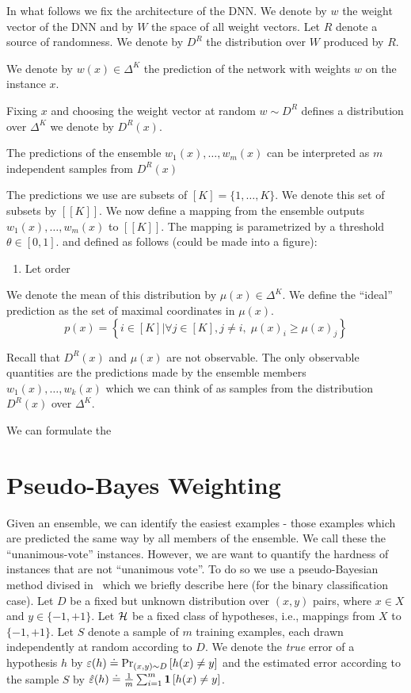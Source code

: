 \documentclass{article}
\begin{document}
In what follows we fix the architecture of the DNN. We denote by $w$
the weight vector of the DNN and by $W$ the space of all weight
vectors.  Let $R$ denote a source of randomness. We denote by $D^R$
the distribution over $W$ produced by $R$. 

We denote by
$w(x) \in \Delta^K$ the prediction of the network with weights $w$ on
the instance $x$.



Fixing $x$ and choosing the weight vector at random $w \sim D^R$
defines a distribution over $\Delta^K$ we denote by $D^R(x)$. 

The predictions of the ensemble $w_1(x),\ldots,w_m(x)$ can be interpreted as $m$ independent samples from $D^R(x)$

The predictions we use are subsets of $[K] = \{1,\ldots,K\}$. We denote this set of subsets by $[[K]]$.
We now define a mapping from the ensemble outputs $w_1(x),\ldots, w_m(x)$ to $[[K]]$.
The mapping is parametrized by a threshold $\theta \in [0,1]$. and defined as follows
(could be made into a figure):
\begin{enumerate}
  \item Let order 
\end{enumerate}

We denote the mean of this distribution by $\mu(x) \in \Delta^K$. We
define the ``ideal'' prediction as the set of maximal coordinates in
$\mu(x)$.
\[
p(x) = \left\{i \in [K] | \forall j \in [K], j \neq i,\; \mu(x)_i \geq \mu(x)_j\right\}
\]

Recall that $D^R(x)$ and $\mu(x)$ are not observable. The only
observable quantities are the predictions made by the ensemble members
$w_1(x),\ldots,w_k(x)$ which we can think of as samples from the
distribution $D^R(x)$ over $\Delta^K$.

We can formulate the 

\newcommand{\ens}{\mbox{ens}_m}



\iffalse
\section{Pseudo-Bayes Weighting}
\label{sec:Pseudo-Bayes}

Given an ensemble, we can identify the easiest examples - those
examples which are predicted the same way by all members of the
ensemble. We call these the ``unanimous-vote'' instances.
However, we are want to quantify the hardness of instances that are
not ``unanimous vote''. To do so we use a pseudo-Bayesian method
divised in~\cite{freund2004generalization} which we briefly describe here (for the binary
classification case).
Let $D$ be a fixed but unknown distribution over $(x,y)$ pairs, where
$x \in X$ and $y \in \{-1,+1\}$. 
Let ${\cal H}$ be a fixed class of hypotheses, i.e., mappings from $X$ to
$\{-1,+1\}$.
Let $S$ denote a sample of $m$ training examples, each drawn independently
at random according to $D$.
We denote the {\em true} error of a hypothesis $h$ by
$\varepsilon(h) \doteq \mbox{Pr}_{(x,y) \sim D}\left[ h(x) \neq y \right]$ and the estimated
error according to the sample $S$ by 
$\hat{\varepsilon}(h) \doteq {1 \over m} \sum_{i=1}^m {\bf 1}\left[ h(x) \neq y
\right]$. 
\end{document}
